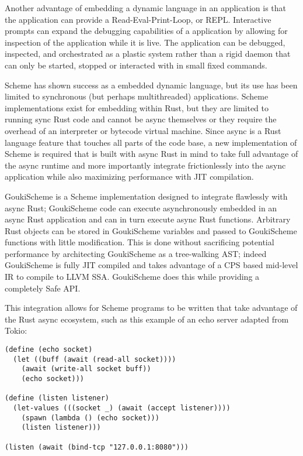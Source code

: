 \documentclass[sigplan,authordraft]{acmart}
\begin{document}
Another advantage of embedding a dynamic language in an application is that the
application can provide a Read-Eval-Print-Loop, or REPL. Interactive prompts can
expand the debugging capabilities of a application by allowing for inspection of
the application while it is live. The application can be debugged, inspected, and
orchestrated as a plastic system rather than a rigid daemon that can only be
started, stopped or interacted with in small fixed commands.

Scheme has shown success as a embedded dynamic language, but its use has been
limited to synchronous (but perhaps multithreaded) applications. Scheme
implementations exist for embedding within Rust, but they are limited to running
sync Rust code and cannot be async themselves or they require the overhead of an
interpreter or bytecode virtual machine. Since async is a Rust language feature
that touches all parts of the code base, a new implementation of Scheme
is required that is built with async Rust in mind to take full advantage of the
async runtime and more importantly integrate frictionlessly into the async
application while also maximizing performance with JIT compilation.

GoukiScheme\cite{gouki} is a Scheme implementation designed to integrate
flawlessly with async Rust; GoukiScheme code can execute asynchronously embedded
in an async Rust application and can in turn execute async Rust functions. Arbitrary Rust
objects can be stored in GoukiScheme variables and passed to GoukiScheme
functions with little modification. This is done without sacrificing potential
performance by architecting GoukiScheme as a tree-walking AST; indeed GoukiScheme
is fully JIT compiled and takes advantage of a CPS based mid-level IR to compile
to LLVM SSA. GoukiScheme does this while providing a completely Safe API.

This integration allows for Scheme programs to be written that take advantage
of the Rust async ecosystem, such as this example of an echo server adapted
from Tokio\cite{tokio}:

\begin{verbatim}
(define (echo socket)
  (let ((buff (await (read-all socket))))
    (await (write-all socket buff))
    (echo socket)))

(define (listen listener)
  (let-values (((socket _) (await (accept listener))))
    (spawn (lambda () (echo socket)))
    (listen listener)))

(listen (await (bind-tcp "127.0.0.1:8080")))
\end{verbatim}
\end{document}
